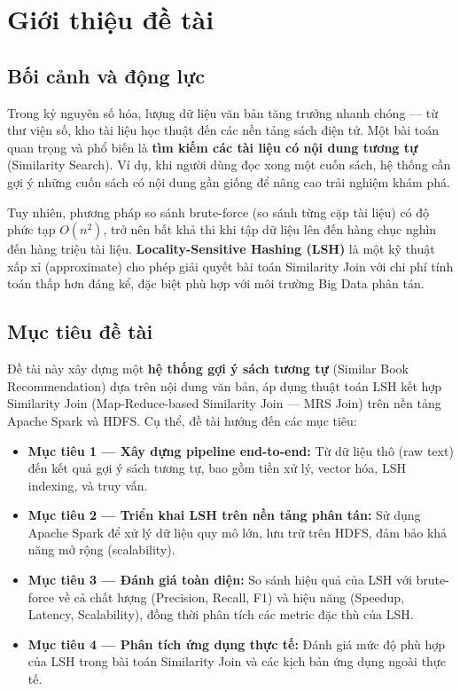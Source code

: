 \newpage
\section{Giới thiệu đề tài}

\subsection{Bối cảnh và động lực}

Trong kỷ nguyên số hóa, lượng dữ liệu văn bản tăng trưởng nhanh chóng --- từ thư viện số, kho tài liệu học thuật đến các nền tảng sách điện tử. Một bài toán quan trọng và phổ biến là \textbf{tìm kiếm các tài liệu có nội dung tương tự} (Similarity Search). Ví dụ, khi người dùng đọc xong một cuốn sách, hệ thống cần gợi ý những cuốn sách có nội dung gần giống để nâng cao trải nghiệm khám phá.

Tuy nhiên, phương pháp so sánh brute-force (so sánh từng cặp tài liệu) có độ phức tạp $O(n^2)$, trở nên bất khả thi khi tập dữ liệu lên đến hàng chục nghìn đến hàng triệu tài liệu. \textbf{Locality-Sensitive Hashing (LSH)} là một kỹ thuật xấp xỉ (approximate) cho phép giải quyết bài toán Similarity Join với chi phí tính toán thấp hơn đáng kể, đặc biệt phù hợp với môi trường Big Data phân tán.

\subsection{Mục tiêu đề tài}

Đề tài này xây dựng một \textbf{hệ thống gợi ý sách tương tự} (Similar Book Recommendation) dựa trên nội dung văn bản, áp dụng thuật toán LSH kết hợp Similarity Join (Map-Reduce-based Similarity Join --- MRS Join) trên nền tảng Apache Spark và HDFS. Cụ thể, đề tài hướng đến các mục tiêu:

\begin{itemize}
    \item \textbf{Mục tiêu 1 --- Xây dựng pipeline end-to-end:} Từ dữ liệu thô (raw text) đến kết quả gợi ý sách tương tự, bao gồm tiền xử lý, vector hóa, LSH indexing, và truy vấn.
    \item \textbf{Mục tiêu 2 --- Triển khai LSH trên nền tảng phân tán:} Sử dụng Apache Spark để xử lý dữ liệu quy mô lớn, lưu trữ trên HDFS, đảm bảo khả năng mở rộng (scalability).
    \item \textbf{Mục tiêu 3 --- Đánh giá toàn diện:} So sánh hiệu quả của LSH với brute-force về cả chất lượng (Precision, Recall, F1) và hiệu năng (Speedup, Latency, Scalability), đồng thời phân tích các metric đặc thù của LSH.
    \item \textbf{Mục tiêu 4 --- Phân tích ứng dụng thực tế:} Đánh giá mức độ phù hợp của LSH trong bài toán Similarity Join và các kịch bản ứng dụng ngoài thực tế.
\end{itemize}

